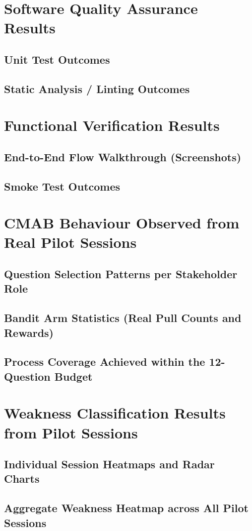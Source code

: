 \documentclass[a4paper, 12pt, oneside, openany, BCOR1cm,toc=chapterentrywithdots]{scrbook}
\begin{document}
\section{Software Quality Assurance Results}
\subsection{Unit Test Outcomes}
\subsection{Static Analysis / Linting Outcomes}
\section{Functional Verification Results}
\subsection{End-to-End Flow Walkthrough (Screenshots)}
\subsection{Smoke Test Outcomes}
\section{CMAB Behaviour Observed from Real Pilot Sessions}
\subsection{Question Selection Patterns per Stakeholder Role}
\subsection{Bandit Arm Statistics (Real Pull Counts and Rewards)}
\subsection{Process Coverage Achieved within the 12-Question Budget}
\section{Weakness Classification Results from Pilot Sessions}
\subsection{Individual Session Heatmaps and Radar Charts}
\subsection{Aggregate Weakness Heatmap across All Pilot Sessions}
\end{document}
